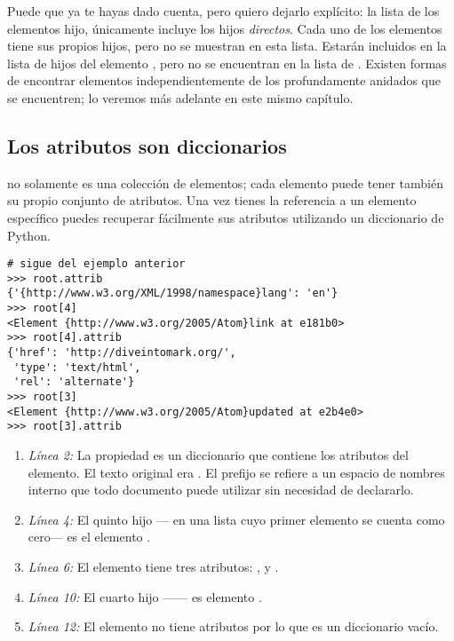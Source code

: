 Puede que ya te hayas dado cuenta, pero quiero dejarlo explícito: la lista de los elementos hijo, únicamente incluye los hijos \emph{directos}. Cada uno de los elementos  tiene sus propios hijos, pero no se muestran en esta lista. Estarán incluidos en la lista de hijos del elemento , pero no se encuentran en la lista de . Existen formas de encontrar elementos independientemente de los profundamente anidados que se encuentren; lo veremos más adelante en este mismo capítulo.

\subsection{Los atributos son diccionarios}

 no solamente es una colección de elementos; cada elemento puede tener también su propio conjunto de atributos. Una vez tienes la referencia a un elemento específico puedes recuperar fácilmente sus atributos utilizando un diccionario de Python.

\noindent\begin{minipage}{\textwidth}
\begin{lstlisting}[mathescape=True]
# sigue del ejemplo anterior
>>> root.attrib
{'{http://www.w3.org/XML/1998/namespace}lang': 'en'}
>>> root[4]
<Element {http://www.w3.org/2005/Atom}link at e181b0>
>>> root[4].attrib
{'href': 'http://diveintomark.org/',
 'type': 'text/html',
 'rel': 'alternate'}
>>> root[3]
<Element {http://www.w3.org/2005/Atom}updated at e2b4e0>
>>> root[3].attrib
\end{lstlisting}
\end{minipage}

\begin{enumerate}

\item \emph{Línea 2:} La propiedad  es un diccionario que contiene los atributos del elemento. El texto  original era . El prefijo  se refiere a un espacio de nombres interno que todo documento  puede utilizar sin necesidad de declararlo.

\item \emph{Línea 4:} El quinto hijo ---\codigo{[4]} en una lista cuyo primer elemento se cuenta como cero--- es el elemento .

\item \emph{Línea 6:} El elemento  tiene tres atributos: ,  y .

\item \emph{Línea 10:} El cuarto hijo ---\codigo{[3]}--- es elemento .

\item \emph{Línea 12:} El elemento  no tiene atributos por lo que  es un diccionario vacío.

\end{enumerate}

